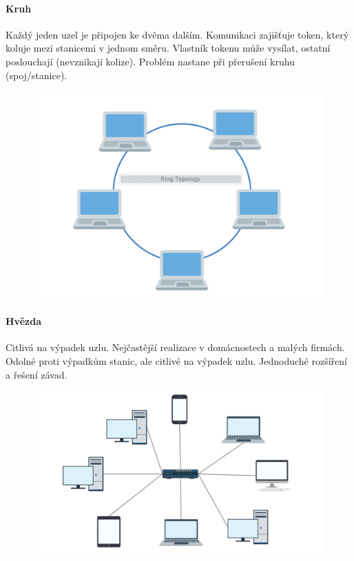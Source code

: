 \paragraph{Kruh}
Každý jeden uzel je připojen ke dvěma dalším. Komunikaci zajišťuje token, který koluje mezi stanicemi 
v jednom směru. Vlastník tokenu může vysílat, ostatní poslouchají (nevznikají kolize). Problém nastane při přerušení kruhu (spoj/stanice).
\begin{figure}[h]
\centering
\includegraphics[scale=0.1]{sections/10_kom_roz_dat_sit/images/ring.png}
\end{figure}

\paragraph{Hvězda}
Citlivá na výpadek uzlu. Nejčastější realizace v domácnostech a malých firmách. Odolné proti výpadkům stanic, ale citlivé na výpadek uzlu. Jednoduché rozšíření a řešení závad.
\begin{figure}[h]
\centering
\includegraphics[scale=0.1]{sections/10_kom_roz_dat_sit/images/star.jpg}
\end{figure}

